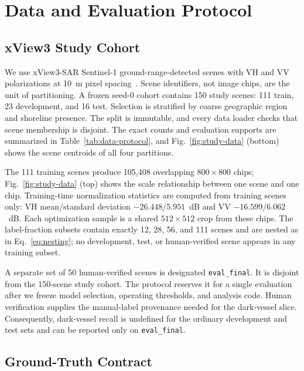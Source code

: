 \section{Data and Evaluation Protocol}
\label{sec:data-evaluation}

\subsection{xView3 Study Cohort}

We use xView3-SAR Sentinel-1 ground-range-detected scenes with VH and VV
polarizations at 10~m pixel spacing~\cite{paolo2022xview3}. Scene identifiers,
not image chips, are the unit of partitioning. A frozen seed-0 cohort contains
150 study scenes: 111 train, 23 development, and 16 test. Selection is
stratified by coarse geographic region and shoreline presence. The split is
immutable, and every data loader checks that scene membership is disjoint.
The exact counts and evaluation supports are summarized in
Table~\ref{tab:data-protocol}, and Fig.~\ref{fig:study-data} (bottom) shows
the scene centroids of all four partitions.




The 111 training scenes produce 105,408 overlapping $800\times800$ chips;
Fig.~\ref{fig:study-data} (top) shows the scale relationship between one
scene and one chip.
Training-time normalization statistics are computed from training scenes
only: VH mean/standard deviation $-26.448/5.951$~dB and VV
$-16.599/6.062$~dB. Each optimization sample is a shared $512\times512$ crop
from these chips. The label-fraction subsets contain exactly 12, 28, 56, and
111 scenes and are nested as in Eq.~\ref{eq:nesting}; no development, test, or
human-verified scene appears in any training subset.

A separate set of 50 human-verified scenes is designated
\texttt{eval\_final}. It is disjoint from the 150-scene study cohort. The
protocol reserves it for a single evaluation after we freeze model selection,
operating thresholds, and analysis code. Human verification supplies the manual-label
provenance needed for the dark-vessel slice. Consequently, dark-vessel recall
is undefined for the ordinary development and test sets and can be reported
only on \texttt{eval\_final}.

\subsection{Ground-Truth Contract}
\label{sec:gt-contract}

